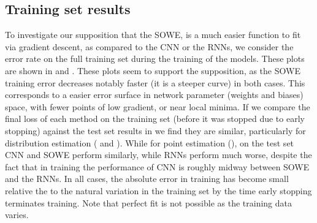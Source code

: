 \documentclass[11pt,a4paper]{article}
\begin{document}
\subsection{Training set results}

To investigate our supposition that the SOWE, is a much easier function to fit via gradient descent, as compared to the CNN or the RNNs, we consider the error rate on the full training set during the training of the models.
These plots are shown in  and .
These plots seem to support the supposition, as the SOWE training error decreases notably faster (it is a steeper curve) in both cases.
This corresponds to a easier error surface in network parameter (weights and biases) space, with fewer points of low gradient, or near local minima.
If we compare the final loss of each method on the training set (before it was stopped due to early stopping) against the test set results in  
we find they are similar,  particularly for distribution estimation (  and ).
While for point estimation (), on the test set CNN and SOWE perform similarly, while RNNs perform much worse, despite the fact that in training the performance of CNN is roughly midway between SOWE and the RNNs.
In all cases, the absolute error in training has become small relative the to the natural variation in the training set by the time early stopping terminates training.
Note that perfect fit is not possible as the training data varies.




\end{document}
